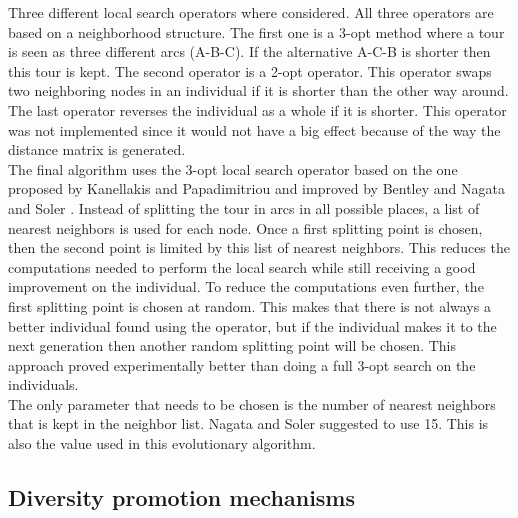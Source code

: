 \documentclass[a4paper,10pt]{article}
\newcommand{\ReplaceMe}[1]{{\color{blue}#1}}
\begin{document}
Three different local search operators where considered. All three operators are based on a neighborhood structure. The first one is a 3-opt method where a tour is seen as three different arcs (A-B-C). If the alternative A-C-B is shorter then this tour is kept. The second operator is a 2-opt operator. This operator swaps two neighboring nodes in an individual if it is shorter than the other way around. The last operator reverses the individual as a whole if it is shorter. This operator was not implemented since it would not have a big effect because of the way the distance matrix is generated.\\
The final algorithm uses the 3-opt local search operator based on the one proposed by Kanellakis and Papadimitriou \cite{kanellakispapadimitriou} and improved by Bentley \cite{bentley} and Nagata and Soler \cite{nagatasoler}. Instead of splitting the tour in arcs in all possible places, a list of nearest neighbors is used for each node. Once a first splitting point is chosen, then the second point is limited by this list of nearest neighbors. This reduces the computations needed to perform the local search while still receiving a good improvement on the individual. To reduce the computations even further, the first splitting point is chosen at random. This makes that there is not always a better individual found using the operator, but if the individual makes it to the next generation then another random splitting point will be chosen. This approach proved experimentally better than doing a full 3-opt search on the individuals.\\
The only parameter that needs to be chosen is the number of nearest neighbors that is kept in the neighbor list. Nagata and Soler suggested to use 15. This is also the value used in this evolutionary algorithm. 

\subsection{Diversity promotion mechanisms} \label{sec:diversity}

\end{document}
